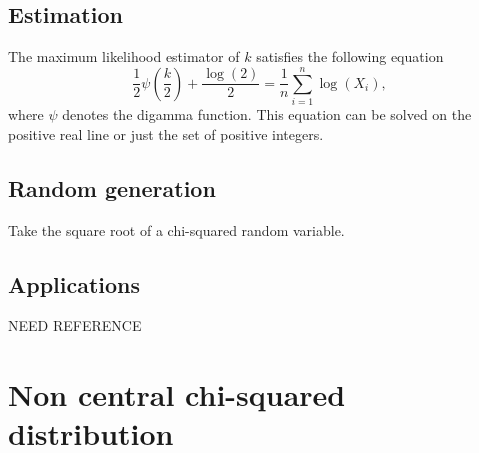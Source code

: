 \subsection{Estimation}
The maximum likelihood estimator of $k$ satisfies the following equation
$$
\frac{1}{2}\psi\left(\frac{k}{2}\right)+ \frac{\log(2)}{2} = \frac{1}{n}\sum_{i=1}^n\log(X_i),
$$
where $\psi$ denotes the digamma function. This equation can be solved on the positive real line or just the set of positive integers.

\subsection{Random generation}
Take the square root of a chi-squared random variable.

\subsection{Applications}
NEED REFERENCE

\section{Non central chi-squared distribution}

